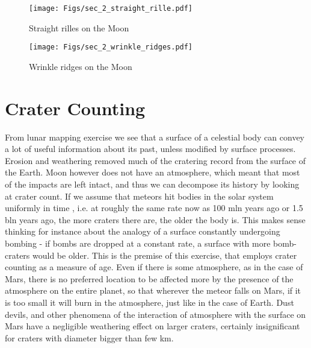 \documentclass[paper=a4, fontsize=11pt]{scrartcl} %
\numberwithin{equation}{section} %
\begin{document}
\begin{figure*}
\centering
	\texttt{[image: Figs/sec\_2\_straight\_rille.pdf]}
	\caption[StraightRille]{Straight rilles on the Moon}
	\label{fig:StraightRille}
\end{figure*}

\begin{figure*}
\centering
	\texttt{[image: Figs/sec\_2\_wrinkle\_ridges.pdf]}
	\caption[Wrinkles]{Wrinkle ridges on the Moon}
	\label{fig:Wrinkles}
\end{figure*}


\newpage 



\section{Crater Counting }

From lunar mapping exercise we see that a surface of a celestial body can convey a lot of useful
information about its past, unless modified by surface processes. Erosion and weathering
removed much of the cratering record from the surface of the Earth. Moon however does not
have an atmosphere, which meant that most of the impacts are left intact, and thus we can
decompose its history by looking at crater count. If we assume that meteors hit bodies in the
solar system uniformly in time , i.e. at roughly the same rate now as 100 mln years ago or
1.5 bln years ago, the more craters there are, the older the body is. This makes sense thinking
for instance about the analogy of a surface constantly undergoing bombing - if bombs
are dropped at a constant rate, a surface with more bomb-craters would be older. This is the
premise of this exercise, that employs crater counting as a measure of age. Even if there is
some atmosphere, as in the case of Mars, there is no preferred location to be affected more
by the presence of the atmosphere on the entire planet, so that wherever the meteor falls on
Mars, if it is too small it will burn in the atmosphere, just like in the case of Earth. Dust devils,
and other phenomena of the interaction of atmosphere with the surface on Mars have a
negligible weathering effect on larger craters, certainly insignificant for craters with diameter
bigger than few km.
\end{document}
